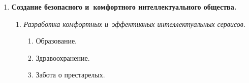 \begin{enumerate}[1.]
\begin{enumerate}[{2}.1]
\begin{enumerate}[{2.3}.1]


\item Широкомасштабная реклама и~содействие преобразованию в~интеллектуальное 


предприятие.


\item Содействие внедрению умных фабрик.


\item Культивирование соревновательности за звание AI-ли\-де\-ров в~различных областях 


индустрии.


\end{enumerate}


\item \textit{Обеспечение режима благоприятствования при внедрении~AI.}


\begin{enumerate}[{2.4}.1]


\item Использование региональных особенностей и~преимуществ.


\item Создание пилотных участков.


\item Создание национального парка~AI.


\item Создание национальной базы~AI.


\end{enumerate}


\end{enumerate}


\item \textbf{Создание безопасного и~комфортного интеллектуального общества.}


\begin{enumerate}[{3}.1]


\item \textit{Разработка комфортных и~эффективных интеллектуальных сервисов.}


\begin{enumerate}[{3.1}.1]


\item Образование.


\item Здравоохранение.


\item Забота о престарелых.


\end{enumerate}



\end{enumerate}
\end{enumerate}
